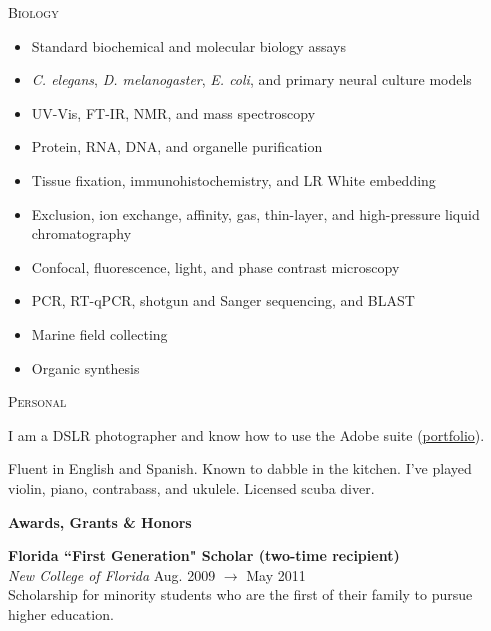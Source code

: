 \documentclass[a4paper,12pt]{article}
\newcommand{\resheading}[1]{{\vspace*{.06in} \colorbox{mygrey}{\begin{minipage}{\textwidth}{\textmd{\large \textbf{#1} \vphantom{p\^{E}}}}\end{minipage}}} }
\newcommand{\ressubheading}[4]{
        \textbf{#1} \hfill #2\\
        \textit{#3} \hfill #4 \\}
\begin{document}
     \textsc{Biology}\vspace*{-15pt}
        \begin{multicols}{2} \begin{itemize}[leftmargin=0.4cm] 
        \item Standard biochemical and molecular biology assays
        \item \textit{C. elegans}, \textit{D. melanogaster}, \textit{E. coli}, and primary neural culture models
        \item UV-Vis, FT-IR, NMR, and mass spectroscopy
        \item Protein, RNA, DNA, and organelle purification
        \item Tissue fixation, immunohistochemistry, and LR White embedding
        \item Exclusion, ion exchange, affinity, gas, thin-layer, and high-pressure liquid chromatography
        \item Confocal, fluorescence, light, and phase contrast microscopy
        \item PCR, RT-qPCR, shotgun and Sanger sequencing, and BLAST
        \item Marine field collecting
        \item Organic synthesis
        \end{itemize}
        \end{multicols}
        
    \textsc{Personal}
        \begin{description}\setlength{\itemsep}{0mm}
        \item[Photography] I am a DSLR photographer and know how to use the Adobe suite (\href{https://www.flickr.com/photos/richarddecal/sets/72157640025469005/}{portfolio}).
        \item[Other] Fluent in English and Spanish. Known to dabble in the kitchen. I've played violin, piano, contrabass, and ukulele. Licensed scuba diver.
        \end{description}

        
        
\resheading{Awards, Grants \& Honors}
    \ressubheading{Florida ``First Generation" Scholar {\normalfont(two-time recipient)}}{}{New College of Florida}{Aug. 2009 $\rightarrow$ May 2011}
    Scholarship for minority students who are the first of their family to pursue higher education.\\ %
\end{document}
